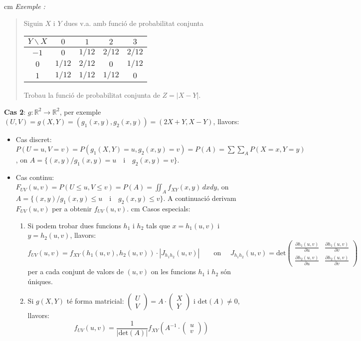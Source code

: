 \documentclass{article}
\newcommand\R{\mathbb{R}}
\newcounter{exctr}
\newenvironment{exemple}
{ \stepcounter{exctr} 
\hspace{0.2cm} 
\textit{Exemple  \arabic{exctr}: }
\it
\begin{quotation}
}{\end{quotation}}
\begin{document}
 cm
\begin{exemple}
Siguin $X$ i $Y$ dues v.a. amb funci\'o de probabilitat conjunta

\begin{center}
\begin{tabular}{c|c|c|c|c|}
$Y \backslash X$ & $0$ & $1$ & $2$ & $3$ \\ \hline
$-1$ & $0$ & $1/12$ & $2/12$ & $2/12$ \\ \hline
$0$ & $1/12$ & $2/12$ & $0$ & $1/12$ \\ \hline
$1$ & $1/12$ & $1/12$ & $1/12$ & $0$ \\ \hline
\end{tabular}
\end{center}

Trobau la funci\'o de probabilitat conjunta de $Z=|X-Y|$.
\end{exemple}

\newpage
\noindent
\textbf{Cas 2}: $g:\R^2 \rightarrow \R^2$, per exemple $(U, V)=g(X, Y)=(g_1(x, y), g_2(x, y))=(2X+Y, X-Y)$, llavors:
\begin{itemize}
\item Cas discret: $P(U=u, V=v)=P(g_1(X, Y)=u, g_2(x, y)=v)=P(A)=\sum\sum_A P(X=x, Y=y)$, on 
$A=\{ (x, y) / g_1(x, y) = u \quad \text{i} \quad g_2(x, y) = v \}$.
\vskip 0.4cm
\item Cas continu: $F_{UV}(u, v)=P(U \leq u, V \leq v)=P(A)=\iint_A f_{XY}(x, y) \, dxdy$, on 
$A=\{ (x, y) / g_1(x, y) \leq u \quad \text{i} \quad g_2(x, y) \leq v \}$.
A continuaci\'o derivam $F_{UV}(u, v)$ per a obtenir $f_{UV}(u, v)$.
 cm
Casos especials:
\begin{enumerate}[1)]
\item Si podem trobar dues funcions $h_1$ i $h_2$ tals que $x=h_1(u, v)$ i $y=h_2(u, v)$, llavors:
\[
f_{UV}(u, v)=f_{XY}(h_1(u, v), h_2(u, v)) \cdot |J_{h_1h_2}(u, v)| \qquad \text{on }\quad
J_{h_1h_2}(u, v)=\mathrm{det} \begin{pmatrix} 
\frac{\partial h_1(u, v)}{\partial u} & \frac{\partial h_1(u, v)}{\partial v} \\
\frac{\partial h_2(u, v)}{\partial u} & \frac{\partial h_2(u, v)}{\partial v} 
\end{pmatrix} 
\]
\noindent
per a cada conjunt de valors de $(u, v)$ on les funcions $h_1$ i $h_2$ s\'on \'uniques.
\item Si $g(X, Y)$ t\'e forma matricial: 
$\begin{pmatrix} U \\ V \end{pmatrix} =A \cdot \begin{pmatrix} X \\ Y \end{pmatrix}$ i $\mathrm{det}(A)\neq 0$,
llavors:
\[
f_{UV}(u, v)=\frac{1}{|\mathrm{det}(A)|} f_{XY} \left( A^{-1} \cdot \begin{pmatrix} u \\ v \end{pmatrix} \right)
\]
\end{enumerate}
\end{itemize}
\end{document}
